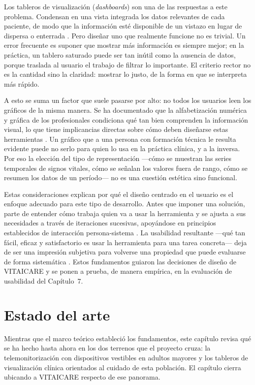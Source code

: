 \documentclass[12pt,a4paper]{article}
\begin{document}
    Los tableros de visualización (\textit{dashboards}) son una de las respuestas a este problema. Condensan en una vista integrada los datos relevantes de cada paciente, de modo que la información esté disponible de un vistazo en lugar de dispersa o enterrada \cite{dowding2015}. Pero diseñar uno que realmente funcione no es trivial. Un error frecuente es suponer que mostrar más información es siempre mejor; en la práctica, un tablero saturado puede ser tan inútil como la ausencia de datos, porque traslada al usuario el trabajo de filtrar lo importante. El criterio rector no es la cantidad sino la claridad: mostrar lo justo, de la forma en que se interpreta más rápido.

    A esto se suma un factor que suele pasarse por alto: no todos los usuarios leen los gráficos de la misma manera. Se ha documentado que la alfabetización numérica y gráfica de los profesionales condiciona qué tan bien comprenden la información visual, lo que tiene implicancias directas sobre cómo deben diseñarse estas herramientas \cite{dowding2018}. Un gráfico que a una persona con formación técnica le resulta evidente puede no serlo para quien lo usa en la práctica clínica, y a la inversa. Por eso la elección del tipo de representación —cómo se muestran las series temporales de signos vitales, cómo se señalan los valores fuera de rango, cómo se resumen los datos de un período— no es una cuestión estética sino funcional.

    Estas consideraciones explican por qué el diseño centrado en el usuario es el enfoque adecuado para este tipo de desarrollo. Antes que imponer una solución, parte de entender cómo trabaja quien va a usar la herramienta y se ajusta a sus necesidades a través de iteraciones sucesivas, apoyándose en principios establecidos de interacción persona-sistema \cite{iso9241}. La usabilidad resultante —qué tan fácil, eficaz y satisfactorio es usar la herramienta para una tarea concreta— deja de ser una impresión subjetiva para volverse una propiedad que puede evaluarse de forma sistemática \cite{dowding2019}. Estos fundamentos guiaron las decisiones de diseño de VITAICARE y se ponen a prueba, de manera empírica, en la evaluación de usabilidad del Capítulo~7.
\newpage

\section{Estado del arte}

    Mientras que el marco teórico estableció los fundamentos, este capítulo revisa qué se ha hecho hasta ahora en los dos terrenos que el proyecto cruza: la telemonitorización con dispositivos vestibles en adultos mayores y los tableros de visualización clínica orientados al cuidado de esta población. El capítulo cierra ubicando a VITAICARE respecto de ese panorama.
\end{document}
